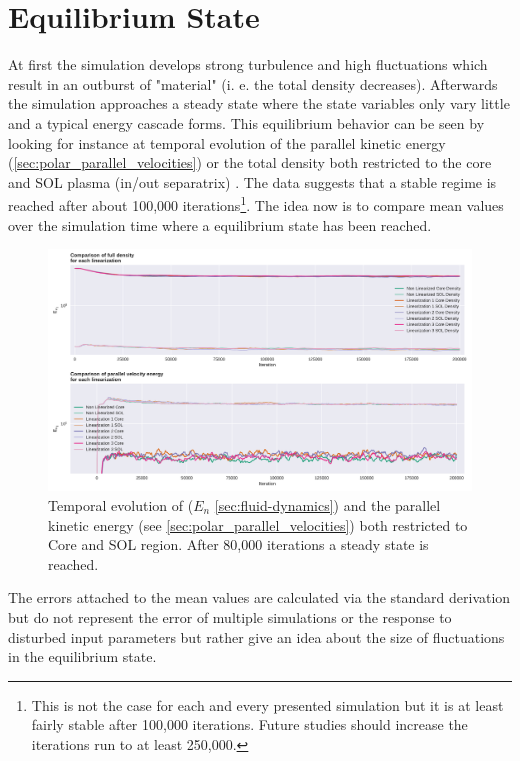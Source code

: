 \documentclass[master.tex]{subfiles}
\begin{document}
\section{Equilibrium State}
At first the simulation develops strong turbulence and high fluctuations which result in an outburst of "material" (i. e. the total density decreases). Afterwards the simulation approaches a steady state where the state variables only vary little and a typical energy cascade forms. This equilibrium behavior can be seen by looking for instance at temporal evolution of the parallel kinetic energy (\autoref{sec:polar_parallel_velocities}) or the total density both restricted to the core and \ac{SOL} plasma (in/out separatrix) . The data suggests that a stable regime is reached after about 100,000 iterations\footnote{This is not the case for each and every presented simulation but it is at least fairly stable after 100,000 iterations. Future studies should increase the iterations run to at least 250,000.}. The idea now is to compare mean values over the simulation time where a equilibrium state has been reached. 

\begin{figure}[!hbtp]
    \includegraphics[width=\linewidth]{pdfs/equilibrium_state_low.pdf}
    \caption{Temporal evolution of ($E_n$ \autoref{sec:fluid-dynamics}) and the parallel kinetic energy (see \autoref{sec:polar_parallel_velocities}) both restricted to Core and \ac{SOL} region. After 80,000 iterations a steady state is reached.}
\end{figure}


\begin{blockquote}
    The errors attached to the mean values are calculated via the standard derivation but do not represent the error of multiple simulations or the response to disturbed input parameters but rather give an idea about the size of fluctuations in the equilibrium state.
\end{blockquote}
    
\end{document}
